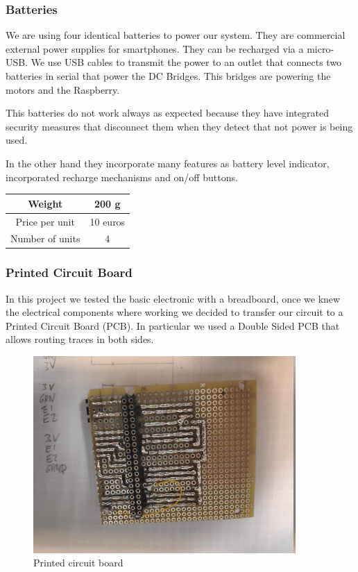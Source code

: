 \subsubsection{Batteries}
We are using four identical batteries to power our system. They are
commercial external power supplies for smartphones. They can be recharged
via a micro-USB. We use USB cables to transmit the power to an outlet
that connects two batteries in serial that power the DC Bridges.
This bridges are powering the motors and the Raspberry.

This batteries do not work always as expected because they have
integrated security measures that disconnect them when they detect
that not power is being used.

In the other hand they incorporate many features as battery level
indicator, incorporated recharge mechanisms and on/off buttons.
\begin{center}
    \begin{tabular}{ |c|c| }
        \hline
        Weight          & 200 g    \\
        \hline
        Price per unit  & 10 euros \\
        \hline
        Number of units & 4        \\
        \hline
    \end{tabular}
\end{center}
\subsubsection{Printed Circuit Board}
In this project we tested the basic electronic with a breadboard, once we knew
the electrical components where working we decided to transfer our circuit to
a Printed Circuit Board (PCB). In particular we used a Double Sided PCB that
allows routing traces in both sides.
\begin{figure}[H]
    \centering
    \includegraphics[width=10cm]{img/components/PCB.jpg}
    \caption{Printed circuit board}
    \label{fig: PCB}
\end{figure}

